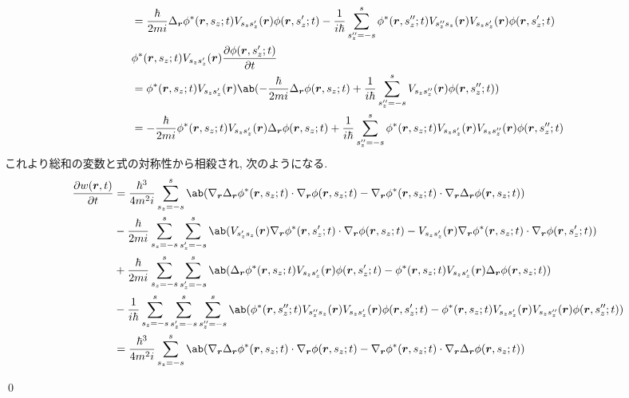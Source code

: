 \documentclass[uplatex,dvipdfmx,a4paper,11pt]{jlreq}
\makeatletter
\newcommand{\rr}{\bm{r}}
\numberwithin{equation}{section}
\theoremstyle{definition}
\renewenvironment{proof}[1][\proofname]{\par
  \normalfont
  \topsep6\p@\@plus6\p@ \trivlist
  \item[\hskip\labelsep{\bfseries #1}\@addpunct{\bfseries}]\ignorespaces\quad\par
}{
  \qed\endtrivlist\@endpefalse
}
\renewcommand\proofname{証明}
\makeatother
\begin{document}
\begin{proof}
\begin{align}
     & = \frac{\hbar}{2mi}\Delta_{\rr}\phi^*(\rr, s_z; t)V_{s_zs_z'}(\rr)\phi(\rr, s_z'; t) - \frac{1}{i\hbar}\sum_{s_z'' = -s}^{s}\phi^*(\rr, s_z''; t)V_{s_z''s_z}(\rr)V_{s_zs_z'}(\rr)\phi(\rr, s_z'; t)                       \\
     & \phi^*(\rr, s_z; t)V_{s_zs_z'}(\rr)\diffp{\phi(\rr, s_z'; t)}{t}                                                                                                                                                           \\
     & = \phi^*(\rr, s_z; t)V_{s_zs_z'}(\rr)\ab(-\frac{\hbar}{2mi}\Delta_{\rr}\phi(\rr, s_z; t) + \frac{1}{i\hbar}\sum_{s_z'' = -s}^{s}V_{s_zs_z''}(\rr)\phi(\rr, s_z''; t))                                                      \\
     & = -\frac{\hbar}{2mi}\phi^*(\rr, s_z; t)V_{s_zs_z'}(\rr)\Delta_{\rr}\phi(\rr, s_z; t) + \frac{1}{i\hbar}\sum_{s_z'' = -s}^{s}\phi^*(\rr, s_z; t)V_{s_zs_z'}(\rr)V_{s_zs_z''}(\rr)\phi(\rr, s_z''; t)
  \end{align}
  これより総和の変数と式の対称性から相殺され, 次のようになる.
  \begin{align}
    \diffp{w(\rr, t)}{t} & = \frac{\hbar^3}{4m^2i}\sum_{s_z = -s}^{s}\ab(\nabla_{\rr}\Delta_{\rr}\phi^*(\rr, s_z; t)\cdot\nabla_{\rr}\phi(\rr, s_z; t) - \nabla_{\rr}\phi^*(\rr, s_z; t)\cdot\nabla_{\rr}\Delta_{\rr}\phi(\rr, s_z; t))                           \\
                         & - \frac{\hbar}{2mi}\sum_{s_z = -s}^{s}\sum_{s_z' = -s}^{s}\ab(V_{s_z's_z}(\rr)\nabla_{\rr}\phi^*(\rr, s_z'; t)\cdot\nabla_{\rr}\phi(\rr, s_z; t) - V_{s_zs_z'}(\rr)\nabla_{\rr}\phi^*(\rr, s_z; t)\cdot\nabla_{\rr}\phi(\rr, s_z'; t)) \\
                         & + \frac{\hbar}{2mi}\sum_{s_z = -s}^{s}\sum_{s_z' = -s}^{s}\ab(\Delta_{\rr}\phi^*(\rr, s_z; t)V_{s_zs_z'}(\rr)\phi(\rr, s_z'; t) - \phi^*(\rr, s_z; t)V_{s_zs_z'}(\rr)\Delta_{\rr}\phi(\rr, s_z; t))                                    \\
                         & - \frac{1}{i\hbar}\sum_{s_z = -s}^{s}\sum_{s_z' = -s}^{s}\sum_{s_z'' = -s}^{s}\ab(\phi^*(\rr, s_z''; t)V_{s_z''s_z}(\rr)V_{s_zs_z'}(\rr)\phi(\rr, s_z'; t) - \phi^*(\rr, s_z; t)V_{s_zs_z'}(\rr)V_{s_zs_z''}(\rr)\phi(\rr, s_z''; t))  \\
                         & = \frac{\hbar^3}{4m^2i}\sum_{s_z = -s}^{s}\ab(\nabla_{\rr}\Delta_{\rr}\phi^*(\rr, s_z; t)\cdot\nabla_{\rr}\phi(\rr, s_z; t) - \nabla_{\rr}\phi^*(\rr, s_z; t)\cdot\nabla_{\rr}\Delta_{\rr}\phi(\rr, s_z; t))                           \\

\end{align}
\end{proof}
\end{document}
